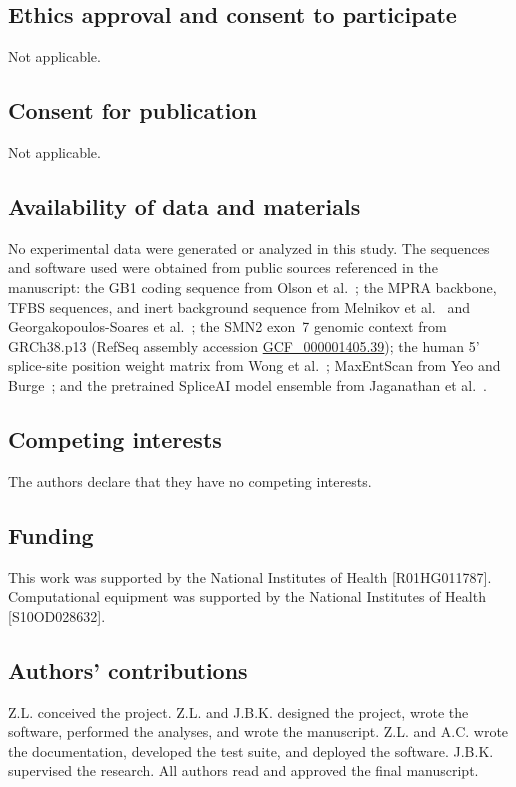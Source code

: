 \documentclass[pdflatex,sn-vancouver-num,referee,oneside]{sn-jnl}
\begin{document}
\subsection*{Ethics approval and consent to participate}
Not applicable.

\subsection*{Consent for publication}
Not applicable.

\subsection*{Availability of data and materials}
No experimental data were generated or analyzed in this study. The sequences and software used were obtained from public sources referenced in the manuscript: the GB1 coding sequence from Olson et al.~\citep{Olson2014iq}; the MPRA backbone, TFBS sequences, and inert background sequence from Melnikov et al.~\citep{Melnikov2012dw} and Georgakopoulos-Soares et al.~\citep{GeorgakopoulosSoares2023tf}; the SMN2 exon~7 genomic context from GRCh38.p13 (RefSeq assembly accession \href{https://www.ncbi.nlm.nih.gov/datasets/genome/GCF_000001405.39/}{GCF\_000001405.39}); the human 5' splice-site position weight matrix from Wong et al.~\citep{Wong2018quantitative}; MaxEntScan from Yeo and Burge~\citep{Yeo2004me}; and the pretrained SpliceAI model ensemble from Jaganathan et al.~\citep{Jaganathan2019ps}.

\subsection*{Competing interests}
The authors declare that they have no competing interests.

\subsection*{Funding}
This work was supported by the National Institutes of Health [R01HG011787]. Computational equipment was supported by the National Institutes of Health [S10OD028632].

\subsection*{Authors' contributions}
Z.L. conceived the project. Z.L. and J.B.K. designed the project, wrote the software, performed the analyses, and wrote the manuscript. Z.L. and A.C. wrote the documentation, developed the test suite, and deployed the software. J.B.K. supervised the research. All authors read and approved the final manuscript.
\end{document}

